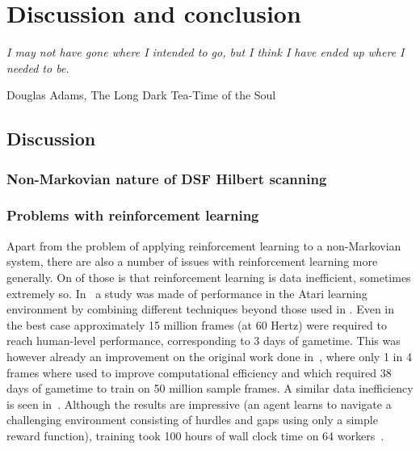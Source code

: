 \documentclass[11pt, a4paper]{report} %
\begin{document}
\chapter{Discussion and conclusion}\label{chap:conclusion}

\epigraph{\textit{I may not have gone where I intended to go, but I think I have ended up where I needed to be.}}{Douglas Adams, The Long Dark Tea-Time of the Soul}

\section{Discussion}

\subsection{Non-Markovian nature of DSF Hilbert scanning}

\cite{whitehead95_reinf_learn_non_markov_decis_proces}

\subsection{Problems with reinforcement learning}


Apart from the problem of applying reinforcement learning to a non-Markovian system, there are also a number of issues with reinforcement learning more generally.
On of those is that reinforcement learning is data inefficient, sometimes extremely so.
In~\cite{1710.02298} a study was made of performance in the Atari learning environment by combining different techniques beyond those used in \cite{mnih13_playin_atari_with_deep_reinf_learn,mnih15_human_level_contr_throug_deep_reinf_learn}.
Even in the best case approximately 15 million frames (at 60 Hertz) were required to reach human-level performance, corresponding to 3 days of gametime.
This was however already an improvement on the original work done in~\cite{mnih15_human_level_contr_throug_deep_reinf_learn}, where only 1 in 4 frames where used to improve computational efficiency and which required 38 days of gametime to train on 50 million sample frames.
A similar data inefficiency is seen in~\cite{heess17_emerg_locom_behav_rich_envir}.
Although the results are impressive (an agent learns to navigate a challenging environment consisting of hurdles and gaps using only a simple reward function), training took 100 hours of wall clock time on 64 workers~\cite[Figure 1]{heess17_emerg_locom_behav_rich_envir}.
\end{document}
